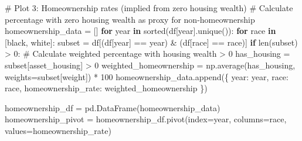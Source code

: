 \documentclass[
  letterpaper,
  DIV=11,
  numbers=noendperiod]{scrartcl}
\newenvironment{Shaded}{\begin{snugshade}}{\end{snugshade}}
\newcommand{\BuiltInTok}[1]{\textcolor[rgb]{0.00,0.23,0.31}{#1}}
\newcommand{\CommentTok}[1]{\textcolor[rgb]{0.37,0.37,0.37}{#1}}
\newcommand{\ControlFlowTok}[1]{\textcolor[rgb]{0.00,0.23,0.31}{\textbf{#1}}}
\newcommand{\DecValTok}[1]{\textcolor[rgb]{0.68,0.00,0.00}{#1}}
\newcommand{\KeywordTok}[1]{\textcolor[rgb]{0.00,0.23,0.31}{\textbf{#1}}}
\newcommand{\NormalTok}[1]{\textcolor[rgb]{0.00,0.23,0.31}{#1}}
\newcommand{\OperatorTok}[1]{\textcolor[rgb]{0.37,0.37,0.37}{#1}}
\newcommand{\StringTok}[1]{\textcolor[rgb]{0.13,0.47,0.30}{#1}}
\begin{document}
\begin{Shaded}
\begin{Highlighting}[]
\CommentTok{\# Plot 3: Homeownership rates (implied from zero housing wealth)}
\CommentTok{\# Calculate percentage with zero housing wealth as proxy for non{-}homeownership}
\NormalTok{homeownership\_data }\OperatorTok{=}\NormalTok{ []}
\ControlFlowTok{for}\NormalTok{ year }\KeywordTok{in} \BuiltInTok{sorted}\NormalTok{(df[}\StringTok{\textquotesingle{}year\textquotesingle{}}\NormalTok{].unique()):}
    \ControlFlowTok{for}\NormalTok{ race }\KeywordTok{in}\NormalTok{ [}\StringTok{\textquotesingle{}black\textquotesingle{}}\NormalTok{, }\StringTok{\textquotesingle{}white\textquotesingle{}}\NormalTok{]:}
\NormalTok{        subset }\OperatorTok{=}\NormalTok{ df[(df[}\StringTok{\textquotesingle{}year\textquotesingle{}}\NormalTok{] }\OperatorTok{==}\NormalTok{ year) }\OperatorTok{\&}\NormalTok{ (df[}\StringTok{\textquotesingle{}race\textquotesingle{}}\NormalTok{] }\OperatorTok{==}\NormalTok{ race)]}
        \ControlFlowTok{if} \BuiltInTok{len}\NormalTok{(subset) }\OperatorTok{\textgreater{}} \DecValTok{0}\NormalTok{:}
            \CommentTok{\# Calculate weighted percentage with housing wealth \textgreater{} 0}
\NormalTok{            has\_housing }\OperatorTok{=}\NormalTok{ subset[}\StringTok{\textquotesingle{}asset\_housing\textquotesingle{}}\NormalTok{] }\OperatorTok{\textgreater{}} \DecValTok{0}
\NormalTok{            weighted\_homeownership }\OperatorTok{=}\NormalTok{ np.average(has\_housing, weights}\OperatorTok{=}\NormalTok{subset[}\StringTok{\textquotesingle{}weight\textquotesingle{}}\NormalTok{]) }\OperatorTok{*} \DecValTok{100}
\NormalTok{            homeownership\_data.append(\{}
                \StringTok{\textquotesingle{}year\textquotesingle{}}\NormalTok{: year,}
                \StringTok{\textquotesingle{}race\textquotesingle{}}\NormalTok{: race,}
                \StringTok{\textquotesingle{}homeownership\_rate\textquotesingle{}}\NormalTok{: weighted\_homeownership}
\NormalTok{            \})}

\NormalTok{homeownership\_df }\OperatorTok{=}\NormalTok{ pd.DataFrame(homeownership\_data)}
\NormalTok{homeownership\_pivot }\OperatorTok{=}\NormalTok{ homeownership\_df.pivot(index}\OperatorTok{=}\StringTok{\textquotesingle{}year\textquotesingle{}}\NormalTok{, columns}\OperatorTok{=}\StringTok{\textquotesingle{}race\textquotesingle{}}\NormalTok{, values}\OperatorTok{=}\StringTok{\textquotesingle{}homeownership\_rate\textquotesingle{}}\NormalTok{)}


\end{Highlighting}
\end{Shaded}
\end{document}

